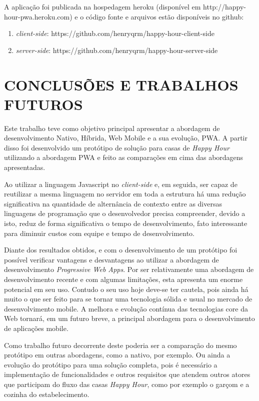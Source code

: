 A aplicação foi publicada na hospedagem heroku (disponível em http://happy-hour-pwa.heroku.com) e o código fonte e arquivos estão disponíveis no github:

\begin{enumerate}
	\item \textit{client-side}: https://github.com/henryqrm/happy-hour-client-side
	\item \textit{server-side}: https://github.com/henryqrm/happy-hour-server-side
\end{enumerate}

\section{\esp CONCLUSÕES E TRABALHOS FUTUROS}

Este trabalho teve como objetivo principal apresentar a abordagem de desenvolvimento Nativo, Híbrida, Web Mobile e a sua evolução, PWA. A partir disso foi desenvolvido um protótipo de solução para casas de \textit{Happy Hour} utilizando a abordagem PWA e feito as comparações em cima das abordagens apresentadas.

Ao utilizar a linguagem Javascript no \textit{client-side} e, em seguida, ser capaz de reutilizar a mesma linguagem no servidor em toda a estrutura há uma redução significativa na quantidade de alternância de contexto entre as diversas linguagens de programação que o desenvolvedor precisa compreender, devido a isto, reduz de forma significativa o tempo de desenvolvimento, fato interessante para diminuir custos com equipe e tempo de desenvolvimento.

Diante dos resultados obtidos, e com o desenvolvimento de um protótipo foi possível verificar vantagens e desvantagens ao utilizar a abordagem de desenvolvimento \textit{Progressive Web Apps}. Por ser relativamente uma abordagem de desenvolvimento recente e com algumas limitações, esta apresenta um enorme potencial em seu uso. Contudo o seu uso hoje deve-se ter cautela, pois ainda há muito o que ser feito para se tornar uma tecnologia sólida e usual no mercado de desenvolvimento mobile. A melhora e evolução contínua das tecnologias core da Web tornará, em um futuro breve, a principal abordagem para o desenvolvimento de aplicações mobile.

Como trabalho futuro decorrente deste poderia ser a comparação do mesmo protótipo em outras abordagens, como a nativo, por exemplo. Ou ainda a evolução do protótipo para uma solução completa, pois é necessário a implementação de funcionalidades e outros requisitos que atendem outros atores que participam do fluxo das casas \textit{Happy Hour}, como por exemplo o garçom e a cozinha do estabelecimento.
















